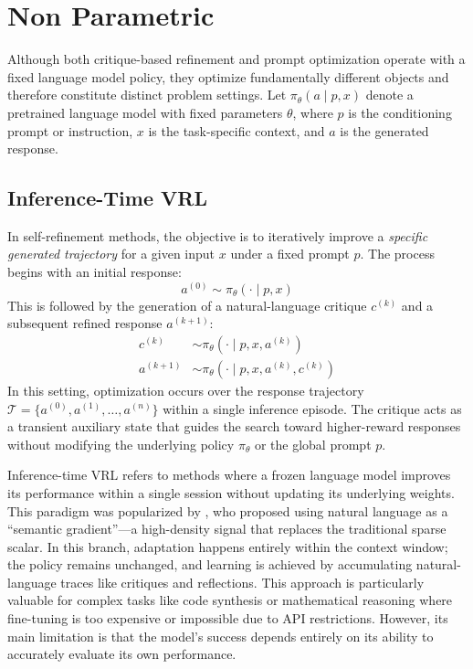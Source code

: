 \section{Non Parametric}
\label{sec:non-parametric}

Although both critique-based refinement and prompt optimization operate with a fixed language model policy, they optimize fundamentally different objects and therefore constitute distinct problem settings. Let $\pi_\theta(a \mid p, x)$ denote a pretrained language model with fixed parameters $\theta$, where $p$ is the conditioning prompt or instruction, $x$ is the task-specific context, and $a$ is the generated response.
\subsection{Inference-Time VRL}
\label{sec:branchA}

In self-refinement methods, the objective is to iteratively improve a \emph{specific generated trajectory} for a given input $x$ under a fixed prompt $p$. The process begins with an initial response:
\begin{equation}
    a^{(0)} \sim \pi_\theta(\cdot \mid p, x)
\end{equation}
This is followed by the generation of a natural-language critique $c^{(k)}$ and a subsequent refined response $a^{(k+1)}$:
\begin{align}
    c^{(k)} &\sim \pi_\theta(\cdot \mid p, x, a^{(k)}) \\
    a^{(k+1)} &\sim \pi_\theta(\cdot \mid p, x, a^{(k)}, c^{(k)})
\end{align}
In this setting, optimization occurs over the response trajectory $\mathcal{T} = \{a^{(0)}, a^{(1)}, \dots, a^{(n)}\}$ within a single inference episode. The critique acts as a transient auxiliary state that guides the search toward higher-reward responses without modifying the underlying policy $\pi_\theta$ or the global prompt $p$.

Inference-time VRL refers to methods where a frozen language model improves its performance within a single session without updating its underlying weights. This paradigm was popularized by \citet{shinn2023reflexion}, who proposed using natural language as a ``semantic gradient''—a high-density signal that replaces the traditional sparse scalar. In this branch, adaptation happens entirely within the context window; the policy remains unchanged, and learning is achieved by accumulating natural-language traces like critiques and reflections. This approach is particularly valuable for complex tasks like code synthesis or mathematical reasoning where fine-tuning is too expensive or impossible due to API restrictions. However, its main limitation is that the model's success depends entirely on its ability to accurately evaluate its own performance.

